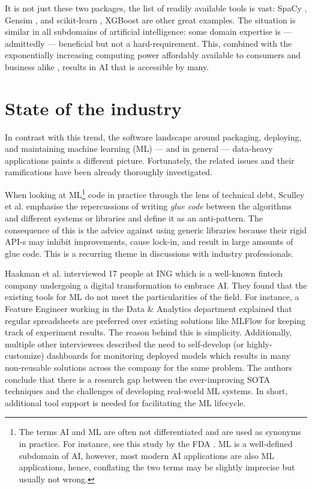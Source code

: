 It is not just these two packages, the list of readily available tools is vast: SpaCy \cite{srinivasa2018natural}, Gensim \cite{vrehuuvrek2011gensim}, and scikit-learn \cite{pedregosa2011scikit}, XGBoost \cite{Chen_2016} are other great examples. The situation is similar in all subdomains of artificial intelligence: some domain expertise is --- admittedly --- beneficial but not a hard-requirement. This, combined with the exponentially increasing computing power affordably available to consumers and business alike \cite{sun2019summarizing}, results in AI that is accessible by many.

\section{State of the industry} \label{section:industry}

In contrast with this trend, the software landscape around packaging, deploying, and maintaining machine learning (ML) --- and in general --- data-heavy applications paints a different picture. Fortunately, the related issues and their ramifications have been already thoroughly investigated.

When looking at ML\footnote{The terms AI and ML are often not differentiated and are used as synonyms in practice. For instance, see this study by the FDA \cite{food2019proposed}. ML is a well-defined subdomain of AI, however, most modern AI applications are also ML applications, hence, conflating the two terms may be slightly imprecise but usually not wrong.} code in practice through the lens of technical debt, Sculley et al. \cite{sculley2015hidden} emphasise the repercussions of writing \textit{glue code} between the algorithms and different systems or libraries and define it as an anti-pattern. The consequence of this is the advice against using generic libraries because their rigid API-s may inhibit improvements, cause lock-in, and result in large amounts of glue code. This is a recurring theme in discussions with industry professionals.

Haakman et al. \cite{haakman2021ai} interviewed 17 people at ING which is a well-known fintech company undergoing a digital transformation to embrace AI. They found that the existing tools for ML do not meet the particularities of the field. For instance, a Feature Engineer working in the Data \& Analytics department explained that regular spreadsheets are preferred over existing solutions like MLFlow for keeping track of experiment results. The reason behind this is simplicity. Additionally, multiple other interviewees described the need to self-develop (or highly-customize) dashboards for monitoring deployed models which results in many non-reusable solutions across the company for the same problem. The authors conclude that there is a research gap between the ever-improving SOTA techniques and the challenges of developing real-world ML systems. In short, additional tool support is needed for facilitating the ML lifecycle.

